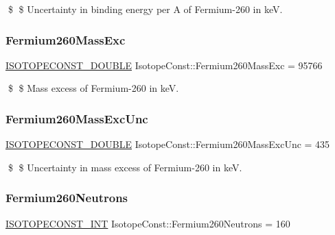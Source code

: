 \$ \$ Uncertainty in binding energy per A of Fermium-\/260 in keV. \mbox{\label{group___isotope_const-_fermium-_fm260_gaba4dfde1488e2b24f38997b37f0abb83}} 
\subsubsection{\texorpdfstring{Fermium260\+Mass\+Exc}{Fermium260MassExc}}
{\footnotesize\ttfamily \mbox{\hyperlink{group___isotope_const-_macros_ga8f45a7272ce02c0b4c65c44636ed719a}{I\+S\+O\+T\+O\+P\+E\+C\+O\+N\+S\+T\+\_\+\+D\+O\+U\+B\+LE}} Isotope\+Const\+::\+Fermium260\+Mass\+Exc = 95766}

\$ \$ Mass excess of Fermium-\/260 in keV. \mbox{\label{group___isotope_const-_fermium-_fm260_ga45657d253710a917d18907cbf2ac8dfe}} 
\subsubsection{\texorpdfstring{Fermium260\+Mass\+Exc\+Unc}{Fermium260MassExcUnc}}
{\footnotesize\ttfamily \mbox{\hyperlink{group___isotope_const-_macros_ga8f45a7272ce02c0b4c65c44636ed719a}{I\+S\+O\+T\+O\+P\+E\+C\+O\+N\+S\+T\+\_\+\+D\+O\+U\+B\+LE}} Isotope\+Const\+::\+Fermium260\+Mass\+Exc\+Unc = 435}

\$ \$ Uncertainty in mass excess of Fermium-\/260 in keV. \mbox{\label{group___isotope_const-_fermium-_fm260_ga226dda4dee409370b26778281edde275}} 
\subsubsection{\texorpdfstring{Fermium260\+Neutrons}{Fermium260Neutrons}}
{\footnotesize\ttfamily \mbox{\hyperlink{group___isotope_const-_macros_ga5f18360b3e99483a35c32d789e62621c}{I\+S\+O\+T\+O\+P\+E\+C\+O\+N\+S\+T\+\_\+\+I\+NT}} Isotope\+Const\+::\+Fermium260\+Neutrons = 160}

